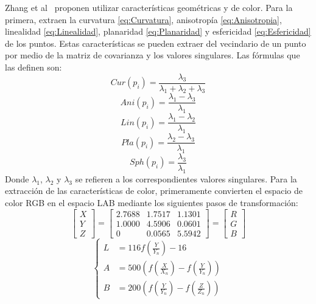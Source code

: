 Zhang et al~\cite{NR3DQA} proponen utilizar características geométricas y de 
color. Para la primera, extraen la curvatura \eqref{eq:Curvatura}, 
anisotropía \eqref{eq:Anisotropia}, linealidad \eqref{eq:Linealidad}, 
planaridad \eqref{eq:Planaridad} y esfericidad \eqref{eq:Esfericidad} de los puntos. 
Estas características se pueden extraer del vecindario 
de un punto por medio de la matriz de covarianza y los valores singulares. 
Las fórmulas que las definen son: 
\begin{equation}
  Cur(p_i) = \frac{\lambda_3}{\lambda_1 + \lambda_2 + \lambda_3}
  \label{eq:Curvatura}
\end{equation}
\begin{equation}
  Ani(p_i) = \frac{\lambda_1 - \lambda_3}{\lambda_1}
  \label{eq:Anisotropia}
\end{equation}
\begin{equation}
  Lin(p_i) = \frac{\lambda_1 - \lambda_2}{\lambda_1}
  \label{eq:Linealidad}
\end{equation}
\begin{equation}
  Pla(p_i) = \frac{\lambda_2 - \lambda_3}{\lambda_1}
  \label{eq:Planaridad}
\end{equation}
\begin{equation}
  Sph(p_i) = \frac{\lambda_3}{\lambda_1}
  \label{eq:Esfericidad}
\end{equation}
Donde $\lambda_1$, $\lambda_2$ y $\lambda_3$ se refieren a los correspondientes 
valores singulares. Para la extracción de las características de color, primeramente 
convierten el espacio de color RGB en el espacio LAB mediante los siguientes 
pasos de transformación: 
\begin{equation}
  \begin{bmatrix} 
    X \\ Y \\ Z 
  \end{bmatrix}  = 
  \begin{bmatrix}
    2.7688 & 1.7517 & 1.1301 \\ 
    1.0000 & 4.5906 & 0.0601 \\ 
    0 & 0.0565 & 5.5942 
  \end{bmatrix} = 
  \begin{bmatrix}
    R \\ G \\ B 
  \end{bmatrix} 
  \label{eq:ScaleXYZ}
\end{equation}
\begin{equation}
\begin{cases}
  L &= 116f\left(\frac{Y}{Y_n}\right) - 16 \\ 
  A &= 500\left( f\left(\frac{X}{X_n}\right) - f\left(\frac{Y}{Y_n}\right) \right) \\ 
  B &= 200\left( f\left(\frac{Y}{Y_n}\right) - f\left(\frac{Z}{Z_n}\right)\right) 
\end{cases}
  \label{eq:LABTransform}
\end{equation}
